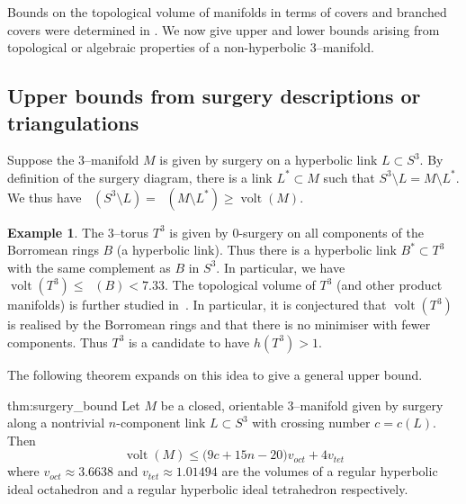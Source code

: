 \documentclass[a4paper]{gtart}
\theoremstyle{definition}
\newtheorem{example}[proposition]{Example}
\theoremstyle{remark}
\numberwithin{equation}{section}
\DeclareMathOperator{\volt}{volt}
\DeclareMathOperator{\volh}{vol_{\mathbb{H}}}
\begin{document}
Bounds on the topological volume of manifolds in terms of covers and branched covers were determined in . 
We now give upper and lower bounds arising from topological or algebraic properties of a non-hyperbolic 3--manifold.

\subsection{Upper bounds from surgery descriptions or triangulations}
\label{ssec:upperlower}

Suppose the $3$--manifold $M$ is given by surgery on a hyperbolic link $L \subset S^3.$ By definition of the surgery diagram, there is a link $L^* \subset M$ such that $S^3 \setminus L = M\setminus L^*.$ We thus have $\volh (S^3 \setminus L) = \volh (M \setminus L^*) \geq \volt (M)$. 

\begin{example}
The 3--torus $T^3$ is given by $0$-surgery on all components of the Borromean rings $B$ (a hyperbolic link). Thus there is a hyperbolic link $B^* \subset T^3$ with the same complement as $B$ in $S^3.$ In particular, we have $\volt(T^3)\leq \volh(B)<7.33$. The topological volume of $T^3$ (and other product manifolds) is further studied in~\cite{volt2}. In particular, it is conjectured that $\volt(T^3)$ is realised by the Borromean rings and that there is no minimiser with fewer components. Thus $T^3$ is a candidate to have $h(T^3)>1$.
\end{example}

The following theorem expands on this idea to give a general upper bound.

\begin{reptheorem}{thm:surgery_bound}
    Let $M$ be a closed, orientable 3--manifold given by surgery along a nontrivial $n$-component link $L\subset S^3$ with crossing number $c=c(L)$. Then 
    \begin{equation*}
        \volt(M)\leq \big(9c+15n-20\big)v_{oct}+4v_{tet}
    \end{equation*}
    where $v_{oct}\approx3.6638$ and $v_{tet}\approx1.01494$ are the volumes of a regular hyperbolic ideal octahedron and a regular hyperbolic ideal tetrahedron respectively.
\end{reptheorem}
\end{document}
